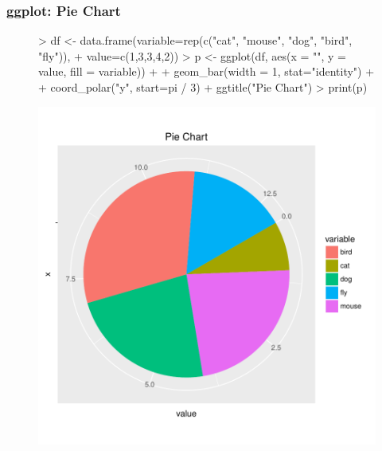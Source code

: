 \documentclass{beamer}
\begin{document}
\begin{frame}[containsverbatim]  
	\frametitle{ggplot: Pie Chart}
\scriptsize 
\begin{figure}
  \centering
\begin{Schunk}
\begin{Sinput}
> df <- data.frame(variable=rep(c("cat", "mouse", "dog", "bird", "fly")), 
+                  value=c(1,3,3,4,2)) 
> p <- ggplot(df, aes(x = "", y = value, fill = variable)) + 
+             geom_bar(width = 1, stat="identity") + 
+             coord_polar("y", start=pi / 3) + ggtitle("Pie Chart") 
> print(p) 
\end{Sinput}
\end{Schunk}
\includegraphics{fig--072}
\label{fig:qplotscatter}
\end{figure}
\end{frame}
\end{document}
